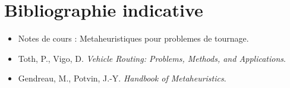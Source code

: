 \documentclass[12pt,a4paper]{report}
\begin{document}
\chapter*{Bibliographie indicative}
\begin{itemize}[leftmargin=1.2cm]
  \item Notes de cours : Metaheuristiques pour problemes de tournage.
  \item Toth, P., Vigo, D. \textit{Vehicle Routing: Problems, Methods, and Applications}.
  \item Gendreau, M., Potvin, J.-Y. \textit{Handbook of Metaheuristics}.
\end{itemize}
\end{document}
